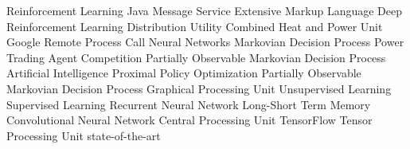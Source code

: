 \begin        {acronym}[Bash]

	       {Reinforcement Learning}
	      {Java Message Service}
	      {Extensive Markup Language}
	   {Deep Reinforcement Learning}
	       {Distribution Utility}
	      {Combined Heat and Power Unit}
	     {Google Remote Process Call}
	       {Neural Networks}
	      {Markovian Decision Process}
	 {Power Trading Agent Competition}
	    {Partially Observable Markovian Decision Process}
	       {Artificial Intelligence}
	      {Proximal Policy Optimization}
	    {Partially Observable Markovian Decision Process}
	      {Graphical Processing Unit}
           {Unsupervised Learning}
           {Supervised Learning}
          {Recurrent Neural Network}
         {Long-Short Term Memory}
          {Convolutional Neural Network}
	      {Central Processing Unit}
	       {TensorFlow}
	      {Tensor Processing Unit}
	     {state-of-the-art}

\end          {acronym}
